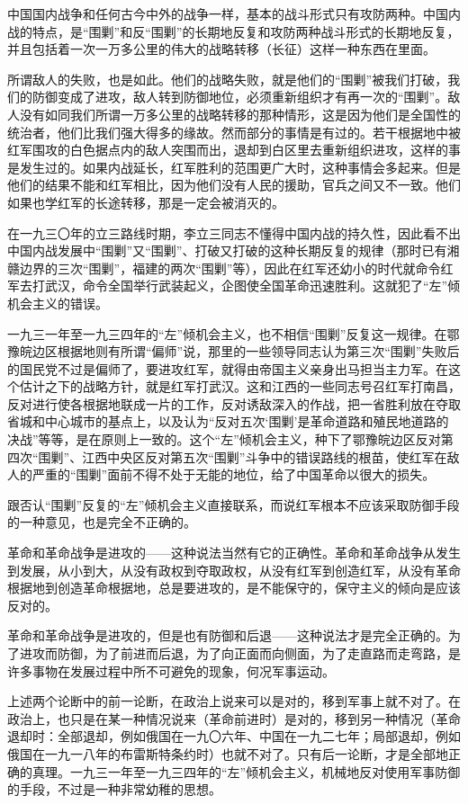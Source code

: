 中国国内战争和任何古今中外的战争一样，基本的战斗形式只有攻防两种。中国内战的特点，是“围剿”和反“围剿”的长期地反复和攻防两种战斗形式的长期地反复，并且包括着一次一万多公里的伟大的战略转移（长征）这样一种东西在里面。

所谓敌人的失败，也是如此。他们的战略失败，就是他们的“围剿”被我们打破，我们的防御变成了进攻，敌人转到防御地位，必须重新组织才有再一次的“围剿”。敌人没有如同我们所谓一万多公里的战略转移的那种情形，这是因为他们是全国性的统治者，他们比我们强大得多的缘故。然而部分的事情是有过的。若干根据地中被红军围攻的白色据点内的敌人突围而出，退却到白区里去重新组织进攻，这样的事是发生过的。如果内战延长，红军胜利的范围更广大时，这种事情会多起来。但是他们的结果不能和红军相比，因为他们没有人民的援助，官兵之间又不一致。他们如果也学红军的长途转移，那是一定会被消灭的。

在一九三〇年的立三路线时期，李立三同志不懂得中国内战的持久性，因此看不出中国内战发展中“围剿”又“围剿”、打破又打破的这种长期反复的规律（那时已有湘赣边界的三次“围剿”，福建的两次“围剿”等），因此在红军还幼小的时代就命令红军去打武汉，命令全国举行武装起义，企图使全国革命迅速胜利。这就犯了“左”倾机会主义的错误。

一九三一年至一九三四年的“左”倾机会主义，也不相信“围剿”反复这一规律。在鄂豫皖边区根据地则有所谓“偏师”说，那里的一些领导同志认为第三次“围剿”失败后的国民党不过是偏师了，要进攻红军，就得由帝国主义亲身出马担当主力军。在这个估计之下的战略方针，就是红军打武汉。这和江西的一些同志号召红军打南昌，反对进行使各根据地联成一片的工作，反对诱敌深入的作战，把一省胜利放在夺取省城和中心城市的基点上，以及认为“反对五次‘围剿’是革命道路和殖民地道路的决战”等等，是在原则上一致的。这个“左”倾机会主义，种下了鄂豫皖边区反对第四次“围剿”、江西中央区反对第五次“围剿”斗争中的错误路线的根苗，使红军在敌人的严重的“围剿”面前不得不处于无能的地位，给了中国革命以很大的损失。

跟否认“围剿”反复的“左”倾机会主义直接联系，而说红军根本不应该采取防御手段的一种意见，也是完全不正确的。

革命和革命战争是进攻的——这种说法当然有它的正确性。革命和革命战争从发生到发展，从小到大，从没有政权到夺取政权，从没有红军到创造红军，从没有革命根据地到创造革命根据地，总是要进攻的，是不能保守的，保守主义的倾向是应该反对的。

革命和革命战争是进攻的，但是也有防御和后退——这种说法才是完全正确的。为了进攻而防御，为了前进而后退，为了向正面而向侧面，为了走直路而走弯路，是许多事物在发展过程中所不可避免的现象，何况军事运动。

上述两个论断中的前一论断，在政治上说来可以是对的，移到军事上就不对了。在政治上，也只是在某一种情况说来（革命前进时）是对的，移到另一种情况（革命退却时：全部退却，例如俄国在一九〇六年、中国在一九二七年；局部退却，例如俄国在一九一八年的布雷斯特条约时）也就不对了。只有后一论断，才是全部地正确的真理。一九三一年至一九三四年的“左”倾机会主义，机械地反对使用军事防御的手段，不过是一种非常幼稚的思想。

